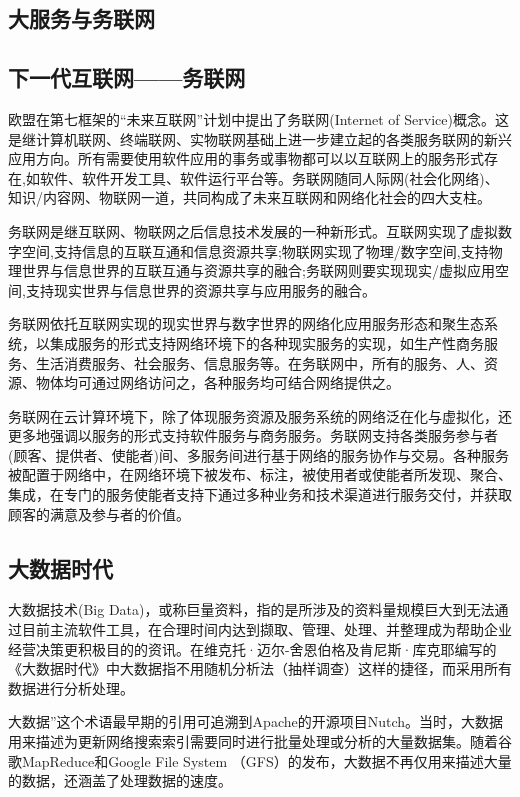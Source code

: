 \documentclass[11pt,a4paper]{article}
\begin{document}
\begin{CJK}{UTF8}{gbsn}
\section{大服务与务联网}
\subsection{下一代互联网——务联网}

欧盟在第七框架的“未来互联网”计划中提出了务联网(Internet of Service)概念。这是继计算机联网、终端联网、实物联网基础上进一步建立起的各类服务联网的新兴应用方向。所有需要使用软件应用的事务或事物都可以以互联网上的服务形式存在,如软件、软件开发工具、软件运行平台等。务联网随同人际网(社会化网络)、知识/内容网、物联网一道，共同构成了未来互联网和网络化社会的四大支柱。

务联网是继互联网、物联网之后信息技术发展的一种新形式。互联网实现了虚拟数字空间,支持信息的互联互通和信息资源共享;物联网实现了物理/数字空间,支持物理世界与信息世界的互联互通与资源共享的融合;务联网则要实现现实/虚拟应用空间,支持现实世界与信息世界的资源共享与应用服务的融合。

务联网依托互联网实现的现实世界与数字世界的网络化应用服务形态和聚生态系统，以集成服务的形式支持网络环境下的各种现实服务的实现，如生产性商务服务、生活消费服务、社会服务、信息服务等。在务联网中，所有的服务、人、资源、物体均可通过网络访问之，各种服务均可结合网络提供之。


务联网在云计算环境下，除了体现服务资源及服务系统的网络泛在化与虚拟化，还更多地强调以服务的形式支持软件服务与商务服务。务联网支持各类服务参与者(顾客、提供者、使能者)间、多服务间进行基于网络的服务协作与交易。各种服务被配置于网络中，在网络环境下被发布、标注，被使用者或使能者所发现、聚合、集成，在专门的服务使能者支持下通过多种业务和技术渠道进行服务交付，并获取顾客的满意及参与者的价值。

\subsection{大数据时代}

大数据技术(Big Data)，或称巨量资料，指的是所涉及的资料量规模巨大到无法通过目前主流软件工具，在合理时间内达到撷取、管理、处理、并整理成为帮助企业经营决策更积极目的的资讯。在维克托·迈尔-舍恩伯格及肯尼斯·库克耶编写的《大数据时代》中大数据指不用随机分析法（抽样调查）这样的捷径，而采用所有数据进行分析处理。

大数据”这个术语最早期的引用可追溯到Apache的开源项目Nutch。当时，大数据用来描述为更新网络搜索索引需要同时进行批量处理或分析的大量数据集。随着谷歌MapReduce和Google File System （GFS）的发布，大数据不再仅用来描述大量的数据，还涵盖了处理数据的速度。


\end{CJK}
\end{document}
